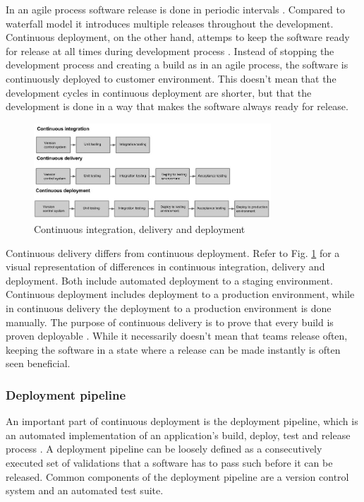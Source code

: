 \documentclass[english]{tktltiki2}
\theoremstyle{definition}
\theoremstyle{remark}
\begin{document}
In an agile process software release is done in periodic intervals \cite{cockburn2002agile}. Compared to waterfall model it introduces multiple releases throughout the development. Continuous deployment, on the other hand, attemps to keep the software ready for release at all times during development process \cite{cdbook}. Instead of stopping the development process and creating a build as in an agile process, the software is continuously deployed to customer environment. This doesn't mean that the development cycles in continuous deployment are shorter, but that the development is done in a way that makes the software always ready for release.
\begin{figure}[!t]
	\centering
	\includegraphics[width=3.5in]{rtvd.jpg}
	\caption{Continuous integration, delivery and deployment}
	\label{fig1}
\end{figure}
Continuous delivery differs from continuous deployment. Refer to Fig. \ref{fig1} for a visual representation of differences in continuous integration, delivery and deployment. Both include automated deployment to a staging environment. Continuous deployment includes deployment to a production environment, while in continuous delivery the deployment to a production environment is done manually. The purpose of continuous delivery is to prove that every build is proven deployable \cite{cdbook}. While it necessarily doesn't mean that teams release often, keeping the software in a state where a release can be made instantly is often seen beneficial.

\subsubsection{Deployment pipeline}
An important part of continuous deployment is the deployment pipeline, which is an automated implementation of an application's build, deploy, test and release process \cite{cdbook}. A deployment pipeline can be loosely defined as a consecutively executed set of validations that a software has to pass such before it can be released. Common components of the deployment pipeline are a version control system and an automated test suite.
\end{document}
